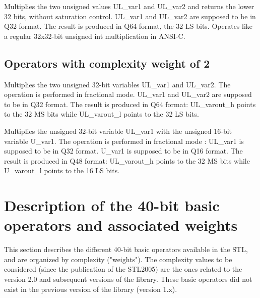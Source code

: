 
Multiplies the two unsigned values UL\_var1 and UL\_var2 and returns the lower 32 bits, without saturation control.
UL\_var1 and UL\_var2 are supposed to be in Q32 format.
The result is produced in Q64 format, the 32 LS bits.
Operates like a regular 32x32-bit unsigned int multiplication in ANSI-C.

\subsection{Operators with complexity weight of 2}


Multiplies the two unsigned 32-bit variables UL\_var1 and UL\_var2.
The operation is performed in fractional mode.
UL\_var1 and UL\_var2 are supposed to be in Q32 format.
The result is produced in Q64 format: UL\_varout\_h points to the 32 MS bits while UL\_varout\_l points to the 32 LS bits.


Multiplies the unsigned 32-bit variable UL\_var1 with the unsigned 16-bit variable U\_var1.
The operation is performed in fractional mode :
UL\_var1 is supposed to be in Q32 format.
U\_var1 is supposed to be in Q16 format.
The result is produced in Q48 format: UL\_varout\_h points to the 32 MS bits while U\_varout\_l points to the 16 LS bits.


\section{Description of the 40-bit basic operators and associated weights}

This section describes the different 40-bit basic operators available in the STL, and are organized by complexity ("weights").
The complexity values to be considered (since the publication of the STL2005) are the ones related to the version 2.0 and subsequent versions of the library.
These basic operators did not exist in the previous version of the library (version 1.x).

